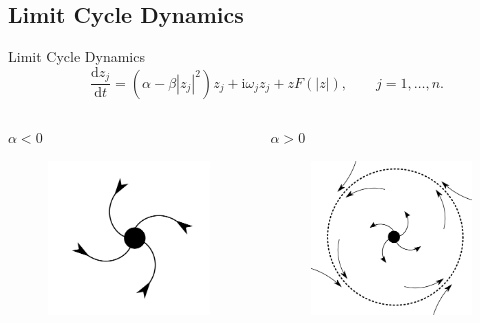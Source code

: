 \documentclass[10pt,reqno]{beamer}
\newcommand{\D}[2]{\frac{\mathrm{d} #1}{\mathrm{d} #2}}
\newcommand{\I}{\mathrm{i}}
\begin{document}
\subsection{Limit Cycle Dynamics}
\begin{frame}{Limit Cycle Dynamics}
\[
\quad \D{z_j}{t} = (\alpha - \beta|z_j|^2)z_j + \I\omega_jz_j +zF(|z|), \qquad j = 1,\ldots, n.
\]
\vfill
\begin{columns}
\begin{column}{.49\textwidth}
\centering $\alpha <0$
\begin{figure}
\includegraphics[scale = 0.16]{node.png}
\end{figure}
\end{column}
\begin{column}{.49\textwidth}
\begin{tcolorbox}[notitle, boxrule=1pt, colback=white]
\centering
$\alpha >0$
\begin{figure}
\includegraphics[scale = 0.16]{hopf.png}

\end{figure}
\end{tcolorbox}
\end{column}
\end{columns}
\end{frame}
\end{document}
